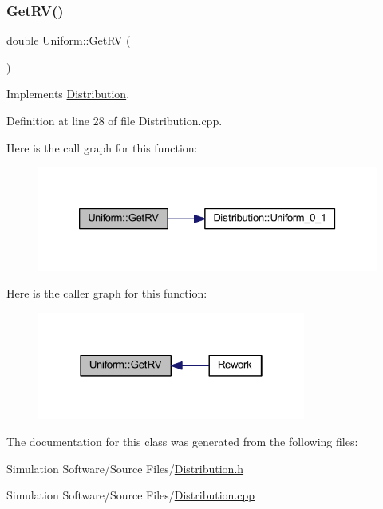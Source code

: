 \subsubsection{\texorpdfstring{Get\+R\+V()}{GetRV()}}
{\footnotesize\ttfamily double Uniform\+::\+Get\+RV (\begin{DoxyParamCaption}{ }\end{DoxyParamCaption})\hspace{0.3cm}{\ttfamily [virtual]}}



Implements \hyperlink{class_distribution_a63b433850d7b47d84eb69448f7916719}{Distribution}.



Definition at line 28 of file Distribution.\+cpp.

Here is the call graph for this function\+:\nopagebreak
\begin{figure}[H]
\begin{center}
\leavevmode
\includegraphics[width=326pt]{class_uniform_a9350886d5ad1854294ecff338a288fc7_cgraph}
\end{center}
\end{figure}
Here is the caller graph for this function\+:\nopagebreak
\begin{figure}[H]
\begin{center}
\leavevmode
\includegraphics[width=250pt]{class_uniform_a9350886d5ad1854294ecff338a288fc7_icgraph}
\end{center}
\end{figure}


The documentation for this class was generated from the following files\+:\begin{DoxyCompactItemize}
\item 
Simulation Software/\+Source Files/\hyperlink{_distribution_8h}{Distribution.\+h}\item 
Simulation Software/\+Source Files/\hyperlink{_distribution_8cpp}{Distribution.\+cpp}\end{DoxyCompactItemize}
